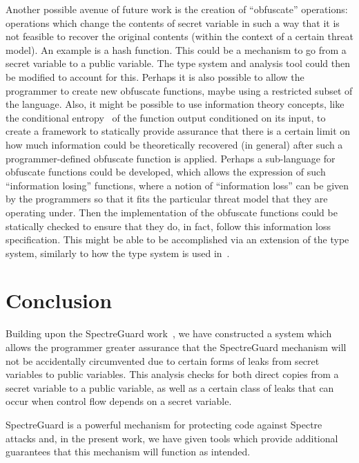 \documentclass[10pt, conference]{IEEEtran}
\begin{document}
Another possible avenue of future work is the creation of ``obfuscate''
operations: operations which change the contents of secret variable in such a
way that it is not feasible to recover the original contents (within the context
of a certain threat model). An example is a hash function. This could be a
mechanism to go from a secret variable to a public variable. The type system and
analysis tool could then be modified to account for this. Perhaps it is also
possible to allow the programmer to create new obfuscate functions, maybe using
a restricted subset of the language. Also, it might be possible to use
information theory concepts, like the conditional entropy~\cite{InfoTheory} of
the function output conditioned on its input, to create a framework to
statically provide assurance that there is a certain limit on how much
information could be theoretically recovered (in general) after such a
programmer-defined obfuscate function is applied. Perhaps a sub-language for
obfuscate functions could be developed, which allows the expression of such
``information losing'' functions, where a notion of ``information loss'' can
be given by the programmers so that it fits the particular threat model
that they are operating under. Then the implementation of the obfuscate
functions could be statically checked to ensure that they do, in fact,
follow this information loss specification. This might be able to be accomplished
via an extension of the type system, similarly to how the type system is used in~\cite{Lifty}.

\section{Conclusion}
\label{sec:Conclusion}

Building upon the SpectreGuard work~\cite{SpectreGuard}, we have constructed
a system which allows the programmer greater assurance that the SpectreGuard
mechanism will not be accidentally circumvented due to certain forms of
leaks from secret variables to public variables. This analysis checks for
both direct copies from a secret variable to a public variable, as well as
a certain class of leaks that can occur when control flow depends on a secret variable.

SpectreGuard is a powerful mechanism for protecting code against Spectre attacks and,
in the present work, we have given tools which provide additional guarantees
that this mechanism will function as intended.




\end{document}

